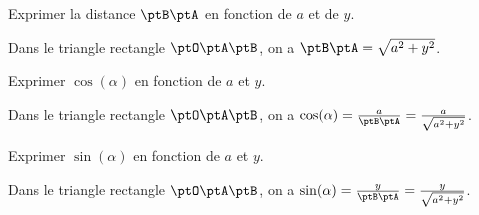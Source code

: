 
\begin{enonce}
Exprimer la distance $\ptB\ptA$ en fonction de $a$ et de $y$. \minusBigskip

\end{enonce}


\begin{corrige}
Dans le triangle rectangle $\ptO\ptA\ptB$, on a ${\ptB\ptA} = \sqrt{a^2 + y^2}$.
\end{corrige}




\begin{enonce}
Exprimer $\cos (\alpha)$ en fonction de $a$ et $y$. \minusBigskip

\end{enonce}


\begin{corrige}
Dans le triangle rectangle $\ptO\ptA\ptB$, on a $\cos (\alpha) = \frac{a}{\ptB\ptA} = \frac{a}{\sqrt{a^2 + y^2}}$.
\end{corrige}





\begin{enonce}
Exprimer $\sin (\alpha)$ en fonction de $a$ et $y$.\minusBigskip

\end{enonce}


\begin{corrige}
Dans le triangle rectangle $\ptO\ptA\ptB$, on a 
	$\sin (\alpha) = \frac{y}{\ptB\ptA} = \frac{y}{\sqrt{a^2 + y^2}}$.
\end{corrige}





